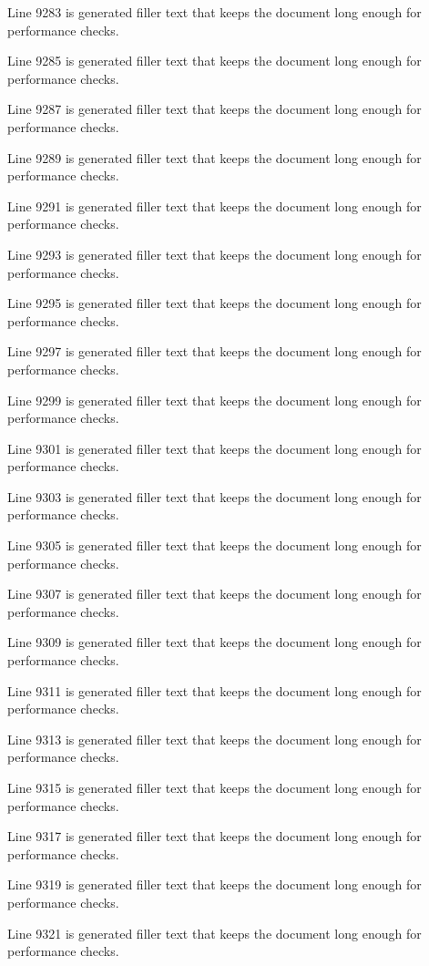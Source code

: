 Line 9283 is generated filler text that keeps the document long enough for performance checks.

Line 9285 is generated filler text that keeps the document long enough for performance checks.

Line 9287 is generated filler text that keeps the document long enough for performance checks.

Line 9289 is generated filler text that keeps the document long enough for performance checks.

Line 9291 is generated filler text that keeps the document long enough for performance checks.

Line 9293 is generated filler text that keeps the document long enough for performance checks.

Line 9295 is generated filler text that keeps the document long enough for performance checks.

Line 9297 is generated filler text that keeps the document long enough for performance checks.

Line 9299 is generated filler text that keeps the document long enough for performance checks.

Line 9301 is generated filler text that keeps the document long enough for performance checks.

Line 9303 is generated filler text that keeps the document long enough for performance checks.

Line 9305 is generated filler text that keeps the document long enough for performance checks.

Line 9307 is generated filler text that keeps the document long enough for performance checks.

Line 9309 is generated filler text that keeps the document long enough for performance checks.

Line 9311 is generated filler text that keeps the document long enough for performance checks.

Line 9313 is generated filler text that keeps the document long enough for performance checks.

Line 9315 is generated filler text that keeps the document long enough for performance checks.

Line 9317 is generated filler text that keeps the document long enough for performance checks.

Line 9319 is generated filler text that keeps the document long enough for performance checks.

Line 9321 is generated filler text that keeps the document long enough for performance checks.

